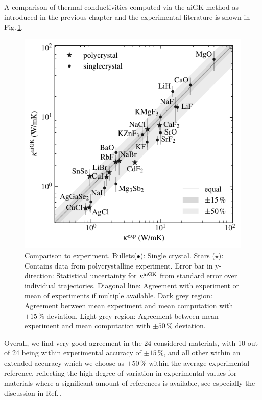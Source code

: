 A comparison of thermal conductivities computed via the aiGK method as introduced in the previous chapter and the experimental literature is shown in Fig.\,\ref{fig:kappa_exp}.
%
\begin{figure}
	\includegraphics[width=\textwidth]{./data/plots/kappa_vs_exp_trusted/kappa_vs_exp_corrected_annotated.pdf}
	\caption{Comparison to experiment. Bullets($\bullet$): Single crystal. Stars ($\star$): Contains data from polycrystalline experiment. Error bar in y-direction: Statistical uncertainty for $\kappa^{\rm aiGK}$ from standard error over individual trajectories. Diagonal line: Agreement with experiment or mean of experiments if multiple available. Dark grey region: Agreement between mean experiment and mean computation with $\pm 15\,\%$ deviation. Light grey region: Agreement between mean experiment and mean computation with $\pm 50\,\%$ deviation.}
	\label{fig:kappa_exp}
\end{figure}
%
Overall, we find very good agreement in the 24 considered materials, with 10 out of 24 being within experimental accuracy of $\pm 15\,\%$, and all other within an extended %
accuracy which we choose as $\pm 50\,\%$ within the average experimental reference, reflecting the high degree of variation in experimental values for materials where a significant amount of references is available, see especially the discussion in Ref.\,\cite{wei2016}. 

